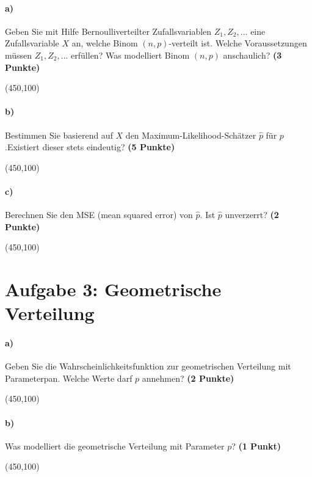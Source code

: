 \documentclass[10pt, a4paper]{article}
\begin{document}
\paragraph{a)} Geben Sie mit Hilfe Bernoulliverteilter Zufallsvariablen $Z_1,Z_2,...$ eine Zufallsvariable $X$ an, welche Binom $(n,p)$-verteilt ist. Welche Voraussetzungen müssen $Z_1,Z_2,...$ erfüllen? Was modelliert Binom $(n,p)$ anschaulich? \textbf{(3 Punkte)}
\begin{center}
  \framebox(450,100){}
\end{center}

\paragraph{b)} Bestimmen Sie basierend auf $X$ den Maximum-Likelihood-Schätzer $\hat{p}$ für $p$.Existiert dieser stets eindeutig? \textbf{(5 Punkte)}
\begin{center}
  \framebox(450,100){}
\end{center}

\paragraph{c)} Berechnen Sie den MSE (mean squared error) von $\hat{p}$. Ist $\hat{p}$ unverzerrt? \textbf{(2 Punkte)}
\begin{center}
  \framebox(450,100){}
\end{center}


\section{Aufgabe 3: Geometrische Verteilung}
\paragraph{a)} Geben Sie die Wahrscheinlichkeitsfunktion zur geometrischen Verteilung mit Parameterpan. Welche Werte darf $p$ annehmen? \textbf{(2 Punkte)}
\begin{center}
  \framebox(450,100){}
\end{center}

\paragraph{b)} Was modelliert die geometrische Verteilung mit Parameter $p$? \textbf{(1 Punkt)}
\begin{center}
  \framebox(450,100){}
\end{center}
\end{document}
